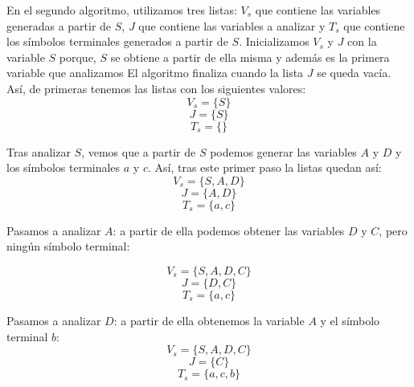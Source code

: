 \documentclass[10pt,a4paper,spanish]{report}
\begin{document}
\begin{enumerate}[a)]
  En el segundo algoritmo, utilizamos tres listas: $V_s$ que contiene las variables generadas a partir de $S$, $J$ que contiene las variables a analizar y $T_s$ que contiene los símbolos terminales generados a partir de $S$. Inicializamos $V_s$ y $J$ con la variable $S$ porque, $S$ se obtiene a partir de ella misma y además es la primera variable que analizamos El algoritmo finaliza cuando la lista $J$ se queda vacía. Así, de primeras tenemos las listas con los siguientes valores:
  \begin{displaymath}
    V_s = \{S\}
  \end{displaymath}
  \begin{displaymath}
    J = \{S\}
  \end{displaymath}
  \begin{displaymath}
    T_s = \{\}
  \end{displaymath}

  Tras analizar $S$, vemos que a partir de $S$ podemos generar las variables $A$ y $D$ y los símbolos terminales $a$ y $c$. Así, tras este primer paso la listas quedan así:
  \begin{displaymath}
    V_s = \{S,A,D\}
  \end{displaymath}
  \begin{displaymath}
    J = \{A,D\}
  \end{displaymath}
  \begin{displaymath}
    T_s = \{a,c\}
  \end{displaymath}
  
  Pasamos a analizar $A$: a partir de ella podemos obtener las  variables $D$ y $C$, pero ningún símbolo terminal:

  \begin{displaymath}
    V_s = \{S,A,D,C\}
  \end{displaymath}
  \begin{displaymath}
    J = \{D,C\}
  \end{displaymath}
  \begin{displaymath}
    T_s = \{a,c\}
  \end{displaymath}

  Pasamos a analizar $D$: a partir de ella obtenemos la variable $A$ y el símbolo terminal $b$:
  \begin{displaymath}
    V_s = \{S,A,D,C\}
  \end{displaymath}
  \begin{displaymath}
    J = \{C\}
  \end{displaymath}
  \begin{displaymath}
    T_s = \{a,c,b\}
  \end{displaymath}


\end{enumerate}
\end{document}
